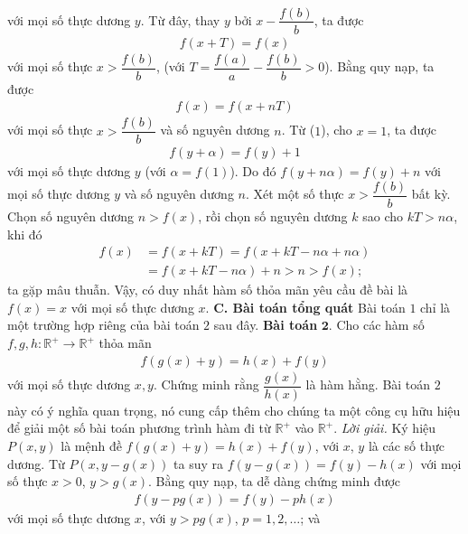 \begin{multicols}{2}
\begin{align*}
	\end{align*}
	với mọi số thực dương $y$. 
	Từ đây, thay $y$ bởi $x - \dfrac{{f(b)}}{b}$,
	ta được
	\begin{align*}
		f(x + T) = f(x)
	\end{align*}
	với mọi số thực $ x > \dfrac{{f(b)}}{b}$,
	(với $T = \dfrac{{f(a)}}{a} - \dfrac{{f(b)}}{b} > 0$).
	Bằng quy nạp, ta được
	\begin{align*}
		f(x) = f(x + nT)
	\end{align*}
	với mọi số thực $x > \dfrac{{f(b)}}{b}$ và số nguyên dương
	$n$.
	Từ ($1$), cho $x=1$, ta được 
	\begin{align*}
		f\left( {y + \alpha } \right) = f(y) + 1
	\end{align*}
	với mọi số thực dương $y$ (với  $\alpha  = f(1)$). Do đó
	$f\left( {y + n\alpha } \right) = f(y) + n$
	với mọi số thực dương $y$ và số nguyên dương $ n$.
	Xét một số thực  $x > \dfrac{{f(b)}}{b}$ bất kỳ. Chọn số nguyên dương $n>f(x)$,  rồi chọn số nguyên dương $k$ sao cho $kT > n\alpha $, khi đó
	\begin{align*}
		f(x)&= f(x + kT) = f\left( {x + kT - n\alpha  + n\alpha } \right)\\
		&= f\left( {x + kT - n\alpha } \right) + n > n > f(x);
	\end{align*}
	ta gặp mâu thuẫn. 
	\vskip 0.1cm
	Vậy, có duy nhất hàm số thỏa mãn yêu cầu đề bài là
	$f(x) = x$ với mọi số thực dương $x$.
	\vskip 0.1cm
	\textbf{\color{hoccungpi}C. Bài toán tổng quát}
	\vskip 0.1cm
	Bài toán $1$ chỉ là một trường hợp riêng của bài toán 
	$2$ sau đây.
	\vskip 0.1cm
	\textbf{\color{hoccungpi}Bài toán} $\pmb{2.}$
	Cho các hàm số $f, g, h: \mathbb{R}^{+} \rightarrow \mathbb{R}^{+}$ thỏa mãn
	\begin{align*}
		f(g(x)+y)=h(x)+f(y)
	\end{align*} 
	với mọi số thực dương $x, y$. Chứng minh rằng  $\dfrac{g(x)}{h(x)}$ là hàm hằng.
	\vskip 0.1cm
	Bài toán $2$ này có ý nghĩa quan trọng, nó cung cấp thêm cho chúng ta một công cụ hữu hiệu để giải một số bài toán phương trình hàm đi từ 
	$\mathbb{R}^{+}$ vào $\mathbb{R}^{+}$. 
	\vskip 0.1cm
	\textit{Lời giải.}
	Ký hiệu $P(x, y)$ là mệnh đề $f(g(x)+y)=h(x)+f(y)$, với $ x$, $y$ là các số thực dương. 
	\vskip 0.1cm
	Từ $P(x, y-g(x))$ ta suy ra
	$
	f(y-g(x))=f(y)-h(x)$ với mọi số thực  $x>0$, $y>g(x)$.
	Bằng quy nạp, ta dễ dàng chứng minh được
	\begin{align*}
		f(y - pg(x)) = f(y) - ph(x)
	\end{align*}
	với mọi số thực dương $ x $, với  $ y > pg(x)$, $p = 1,2, \ldots $; và

\end{multicols}
